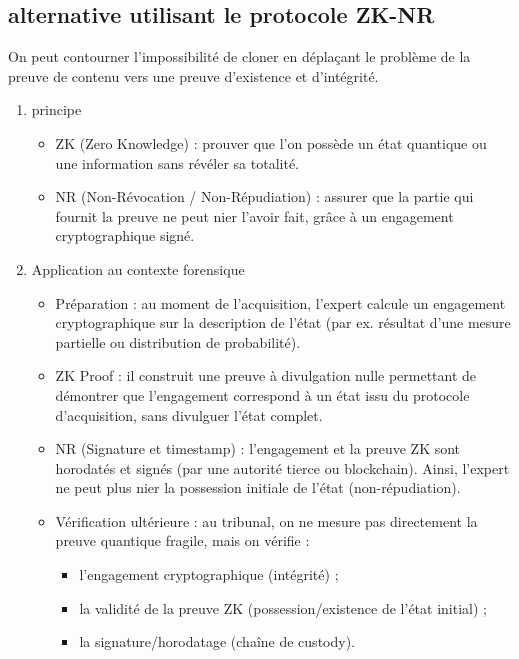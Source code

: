 \documentclass[12pt,a4paper]{article}
\begin{document}
	 \subsection{alternative utilisant le protocole ZK-NR}
	 On peut contourner l’impossibilité de cloner en déplaçant le problème de la preuve de contenu vers une preuve d’existence et d’intégrité.
	 \begin{enumerate}
	 	\item principe
	 		\begin{itemize}
	 			\item ZK (Zero Knowledge) : prouver que l’on possède un état quantique ou une information sans révéler sa totalité.
	 			\item NR (Non-Révocation / Non-Répudiation) : assurer que la partie qui fournit la preuve ne peut nier l’avoir fait, grâce à un engagement cryptographique signé.
	 		\end{itemize}
	 	\item Application au contexte forensique
	 		\begin{itemize}
	 			\item Préparation : au moment de l’acquisition, l’expert calcule un engagement cryptographique sur la description de l’état (par ex. résultat d’une mesure partielle ou distribution de probabilité).
	 			
	 			\item ZK Proof : il construit une preuve à divulgation nulle permettant de démontrer que l’engagement correspond à un état issu du protocole d’acquisition, sans divulguer l’état complet.
	 			
	 			\item NR (Signature et timestamp) : l’engagement et la preuve ZK sont horodatés et signés (par une autorité tierce ou blockchain). Ainsi, l’expert ne peut plus nier la possession initiale de l’état (non-répudiation).
	 			
	 			\item Vérification ultérieure : au tribunal, on ne mesure pas directement la preuve quantique fragile, mais on vérifie :
	 				\begin{itemize}
	 					\item l’engagement cryptographique (intégrité) ;
	 					
	 					\item la validité de la preuve ZK (possession/existence de l’état initial) ;
	 					
	 					\item la signature/horodatage (chaîne de custody).
	 				\end{itemize}
	 		\end{itemize}
	 \end{enumerate}
\end{document}
